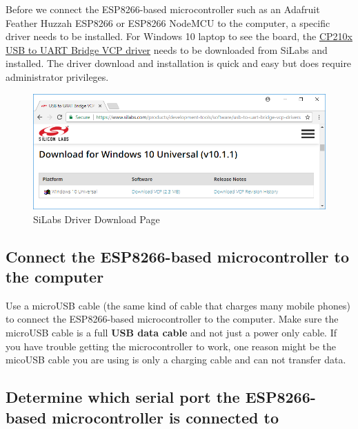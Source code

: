 \documentclass{book}
\makeatletter
\def\maxwidth{\ifdim\Gin@nat@width>\linewidth\linewidth
    \else\Gin@nat@width\fi}
\let\Oldincludegraphics\includegraphics
\renewcommand{\includegraphics}[1]{\Oldincludegraphics[width=.8\maxwidth]{#1}}
\makeatother
\begin{document}
    
        Before we connect the ESP8266-based microcontroller such as an Adafruit
Feather Huzzah ESP8266 or ESP8266 NodeMCU to the computer, a specific
driver needs to be installed. For Windows 10 laptop to see the board,
the
\href{https://www.silabs.com/products/development-tools/software/usb-to-uart-bridge-vcp-drivers}{CP210x
USB to UART Bridge VCP driver} needs to be downloaded from SiLabs and
installed. The driver download and installation is quick and easy but
does require administrator privileges.

\begin{figure}
\centering
\includegraphics{images/download_silabs_driver.PNG}
\caption{SiLabs Driver Download Page}
\end{figure}
    




    
        \subsection{Connect the ESP8266-based microcontroller to the
computer}\label{connect-the-esp8266-based-microcontroller-to-the-computer}
    




    
        Use a microUSB cable (the same kind of cable that charges many mobile
phones) to connect the ESP8266-based microcontroller to the computer.
Make sure the microUSB cable is a full \textbf{USB data cable} and not
just a power only cable. If you have trouble getting the microcontroller
to work, one reason might be the micoUSB cable you are using is only a
charging cable and can not transfer data.
    




    
        \subsection{Determine which serial port the ESP8266-based
microcontroller is connected
to}\label{determine-which-serial-port-the-esp8266-based-microcontroller-is-connected-to}
    
\end{document}
